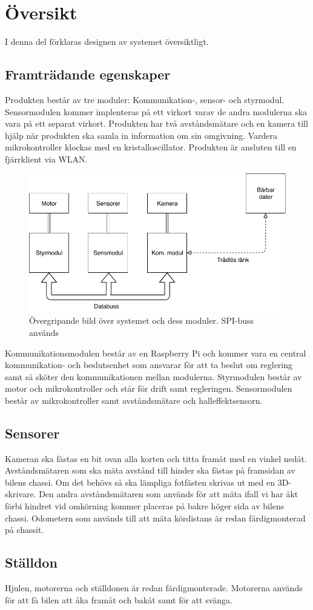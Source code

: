 \documentclass[designspec/spec.tex]{subfiles}
\begin{document}
\section{Översikt}
I denna del förklaras designen av systemet översiktligt.

\subsection{Framträdande egenskaper}
Produkten består av tre moduler: Kommunikation-, sensor- och styrmodul.
Sensormodulen kommer implenteras på ett virkort varav de andra modulerna ska
vara på ett separat virkort. Produkten har två avståndsmätare och en kamera
till hjälp när produkten ska samla in information om sin omgivning. Vardera
mikrokontroller klockas med en kristalloscillator. Produkten är ansluten till en
fjärrklient via WLAN.

\begin{figure}[h]
    \centering
    \includegraphics[width=0.65\linewidth]{designspec/fig/blockskiss.pdf}
    \caption{Övergripande bild över systemet och dess moduler. SPI-buss används}
    \label{fig:overview}
\end{figure}
\noindent
Kommunikationsmodulen består av en Raspberry Pi och kommer vara en central
kommunikation- och beslutsenhet som ansvarar för att ta beslut om reglering
samt så sköter den kommunikationen mellan modulerna. Styrmodulen består av
motor och mikrokontroller och står för drift samt regleringen. Sensormodulen
består av mikrokontroller samt avståndsmätare och halleffektsensorn.

\subsection{Sensorer}
Kameran ska fästas en bit ovan alla korten och titta framåt med en vinkel
nedåt. Avståndsmätaren som ska mäta avstånd till hinder ska fästas på framsidan
av bilens chassi. Om det behövs så ska lämpliga fotfästen skrivas ut med en
3D-skrivare. Den andra avståndsmätaren som används för att mäta ifall vi har
åkt förbi hindret vid omkörning kommer placeras på bakre höger sida av bilens
chassi. Odometern som används till att mäta kördistans är redan färdigmonterad
på chassit.

\subsection{Ställdon}
Hjulen, motorerna och ställdonen är redan färdigmonterade. Motorerna används
för att få bilen att åka framåt och bakåt samt för att svänga.
\end{document}
